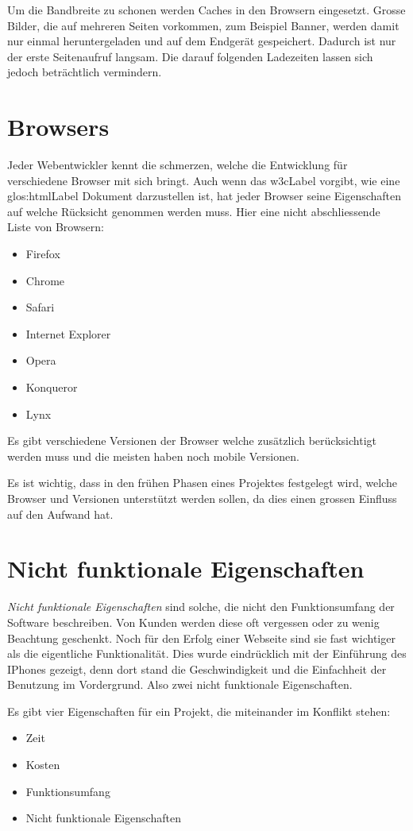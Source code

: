 Um die Bandbreite zu schonen werden Caches in den Browsern eingesetzt. Grosse Bilder, die auf mehreren Seiten vorkommen, zum Beispiel Banner, werden damit nur einmal heruntergeladen und auf dem Endgerät gespeichert. Dadurch ist nur der erste Seitenaufruf langsam. Die darauf folgenden Ladezeiten lassen sich jedoch beträchtlich vermindern.

\section{Browsers}
Jeder Webentwickler kennt die schmerzen, welche  die Entwicklung für verschiedene Browser mit sich bringt. Auch wenn das \gls{w3cLabel} vorgibt, wie eine \Gls{glos:htmlLabel} Dokument darzustellen ist, hat jeder Browser seine Eigenschaften auf welche Rücksicht genommen werden muss. Hier eine nicht abschliessende Liste von Browsern:
\begin{itemize}
\item Firefox
\item Chrome
\item Safari
\item Internet Explorer
\item Opera
\item Konqueror
\item Lynx
\end{itemize}
Es gibt verschiedene Versionen der Browser welche zusätzlich berücksichtigt werden muss und die meisten haben noch mobile Versionen.

Es ist wichtig, dass in den frühen Phasen eines Projektes festgelegt wird, welche Browser und Versionen unterstützt werden sollen, da dies einen grossen Einfluss auf den Aufwand hat.

\section{Nicht funktionale Eigenschaften}
\textit{Nicht funktionale Eigenschaften} sind solche, die nicht den Funktionsumfang der Software beschreiben. Von Kunden werden diese oft vergessen oder zu wenig Beachtung geschenkt. Noch für den Erfolg einer Webseite sind sie fast wichtiger als die eigentliche Funktionalität. Dies wurde eindrücklich mit der Einführung des IPhones gezeigt, denn dort stand die Geschwindigkeit und die Einfachheit der Benutzung im Vordergrund. Also zwei nicht funktionale Eigenschaften. 

Es gibt vier Eigenschaften für ein Projekt, die miteinander im Konflikt stehen:
\begin{itemize}
\item Zeit
\item Kosten
\item Funktionsumfang
\item Nicht funktionale Eigenschaften
\end{itemize}

